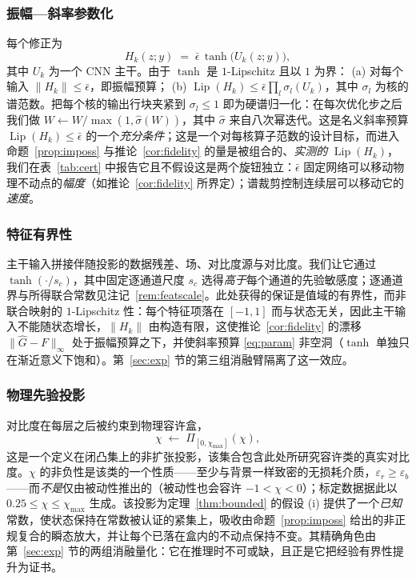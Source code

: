 \documentclass[UTF8,a4paper,11pt]{ctexart}
\newcommand{\norm}[1]{\lVert #1 \rVert}
\begin{document}
\subsubsection{振幅—斜率参数化}
每个修正为
\begin{equation}\label{eq:param}
H_k(z;y) \;=\; \bar\epsilon\,\tanh\!\big(U_k(z;y)\big),
\end{equation}
其中 $U_k$ 为一个 CNN 主干。由于 $\tanh$ 是 $1$-Lipschitz 且以 $1$ 为界：
(a) 对每个输入 $\norm{H_k}\le\bar\epsilon$，即振幅预算；
(b) $\operatorname{Lip}(H_k)\le\bar\epsilon\prod_l\sigma_l(U_k)$，其中 $\sigma_l$ 为核的谱范数。把每个核的输出行块夹紧到 $\sigma_l\le1$ 即为硬谱归一化：在每次优化步之后我们做 $W\leftarrow W/\max(1,\hat\sigma(W))$，其中 $\hat\sigma$ 来自八次幂迭代。这是名义斜率预算 $\operatorname{Lip}(H_k)\le\bar\epsilon$ 的一个\emph{充分条件}；这是一个对每核算子范数的设计目标，而进入命题~\ref{prop:imposs} 与推论~\ref{cor:fidelity} 的量是被组合的、\emph{实测的} $\operatorname{Lip}(H_k)$，我们在表~\ref{tab:cert} 中报告它且不假设这是两个旋钮独立：$\bar\epsilon$ 固定网络可以移动物理不动点的\emph{幅度}（如推论~\ref{cor:fidelity} 所界定）；谱裁剪控制连续层可以移动它的\emph{速度}。

\subsubsection{特征有界性}
主干输入拼接伴随投影的数据残差、场、对比度源与对比度。我们让它通过 $\tanh(\cdot/s_c)$，其中固定逐通道尺度 $s_c$ 选得\emph{高于}每个通道的先验敏感度；逐通道界与所得联合常数见注记~\ref{rem:featscale}。此处获得的保证是值域的有界性，而非联合映射的 $1$-Lipschitz 性：每个特征项落在 $[-1,1]$ 而与状态无关，因此主干输入不能随状态增长，$\norm{H_k}$ 由构造有限，这使推论~\ref{cor:fidelity} 的漂移 $\norm{\hat G-F}_\infty$ 处于振幅预算之下，并使斜率预算 \eqref{eq:param} 非空洞（$\tanh$ 单独只在渐近意义下饱和）。第~\ref{sec:exp} 节的第三组消融臂隔离了这一效应。

\subsubsection{物理先验投影}
对比度在每层之后被约束到物理容许盒，
\begin{equation}\label{eq:proj}
\chi \;\leftarrow\; \Pi_{[0,\chi_{\max}]}(\chi),
\end{equation}
这是一个定义在闭凸集上的非扩张投影，该集合包含此处所研究容许类的真实对比度。$\chi$ 的非负性是该类的一个性质——至少与背景一样致密的无损耗介质，$\varepsilon_r\ge\varepsilon_b$——而\emph{不是}仅由被动性推出的（被动性也会容许 $-1<\chi<0$）；标定数据据此以 $0.25\le\chi\le\chi_{\max}$ 生成。该投影为定理~\ref{thm:bounded} 的假设 (i) 提供了一个\emph{已知}常数，使状态保持在常数被认证的紧集上，吸收由命题~\ref{prop:imposs} 给出的非正规复合的瞬态放大，并让每个已落在盒内的不动点保持不变。其精确角色由第~\ref{sec:exp} 节的两组消融量化：它在推理时不可或缺，且正是它把经验有界性提升为证书。
\end{document}

